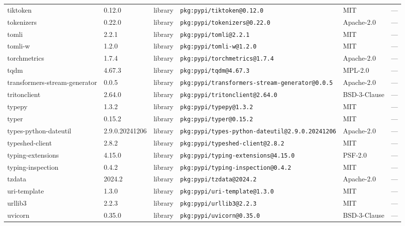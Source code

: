 \documentclass[11pt,a4paper]{article}
\begin{document}
\begin{longtable}{|p{4cm}|p{2cm}|p{1.6cm}|p{5cm}|p{1.5cm}|p{3.5cm}|}
\raggedright tiktoken & 0.12.0 & library & \small\texttt{pkg:pypi/tiktoken@0.12.0} & MIT & \small — \\
\raggedright tokenizers & 0.22.0 & library & \small\texttt{pkg:pypi/tokenizers@0.22.0} & Apache-2.0 & \small — \\
\raggedright tomli & 2.2.1 & library & \small\texttt{pkg:pypi/tomli@2.2.1} & MIT & \small — \\
\raggedright tomli-w & 1.2.0 & library & \small\texttt{pkg:pypi/tomli-w@1.2.0} & MIT & \small — \\
\raggedright torchmetrics & 1.7.4 & library & \small\texttt{pkg:pypi/torchmetrics@1.7.4} & Apache-2.0 & \small — \\
\raggedright tqdm & 4.67.3 & library & \small\texttt{pkg:pypi/tqdm@4.67.3} & MPL-2.0 & \small — \\
\raggedright transformers-stream-generator & 0.0.5 & library & \small\texttt{pkg:pypi/transformers-stream-generator@0.0.5} & Apache-2.0 & \small — \\
\raggedright tritonclient & 2.64.0 & library & \small\texttt{pkg:pypi/tritonclient@2.64.0} & BSD-3-Clause & \small — \\
\raggedright typepy & 1.3.2 & library & \small\texttt{pkg:pypi/typepy@1.3.2} & MIT & \small — \\
\raggedright typer & 0.15.2 & library & \small\texttt{pkg:pypi/typer@0.15.2} & MIT & \small — \\
\raggedright types-python-dateutil & 2.9.0.20241206 & library & \small\texttt{pkg:pypi/types-python-dateutil@2.9.0.20241206} & Apache-2.0 & \small — \\
\raggedright typeshed-client & 2.8.2 & library & \small\texttt{pkg:pypi/typeshed-client@2.8.2} & MIT & \small — \\
\raggedright typing-extensions & 4.15.0 & library & \small\texttt{pkg:pypi/typing-extensions@4.15.0} & PSF-2.0 & \small — \\
\raggedright typing-inspection & 0.4.2 & library & \small\texttt{pkg:pypi/typing-inspection@0.4.2} & MIT & \small — \\
\raggedright tzdata & 2024.2 & library & \small\texttt{pkg:pypi/tzdata@2024.2} & Apache-2.0 & \small — \\
\raggedright uri-template & 1.3.0 & library & \small\texttt{pkg:pypi/uri-template@1.3.0} & MIT & \small — \\
\raggedright urllib3 & 2.2.3 & library & \small\texttt{pkg:pypi/urllib3@2.2.3} & MIT & \small — \\
\raggedright uvicorn & 0.35.0 & library & \small\texttt{pkg:pypi/uvicorn@0.35.0} & BSD-3-Clause & \small — \\

\end{longtable}
\end{document}

